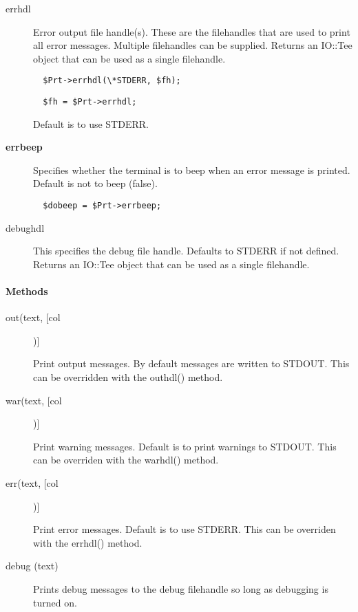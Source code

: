 \begin{description}
\item[errhdl] \mbox{}

Error output file handle(s). These are the filehandles that are used
to print all error messages. Multiple filehandles can be supplied.
Returns an IO::Tee object that can be used as a single filehandle.

\begin{verbatim}
  $Prt->errhdl(\*STDERR, $fh);
\end{verbatim}
\begin{verbatim}
  $fh = $Prt->errhdl;
\end{verbatim}


Default is to use STDERR.

\item[\textbf{errbeep}] \mbox{}

Specifies whether the terminal is to beep when an error
message is printed. Default is not to beep (false).

\begin{verbatim}
  $dobeep = $Prt->errbeep;
\end{verbatim}
\item[debughdl] \mbox{}

This specifies the debug file handle. Defaults to STDERR if not 
defined. Returns an IO::Tee object that can be used as a single
filehandle.

\end{description}
\paragraph*{Methods\label{ORAC::Print_Methods}}\begin{description}
\item[out(text, [col])] \mbox{}

Print output messages.
By default messages are written to STDOUT. This can be overridden with
the outhdl() method.

\item[war(text, [col])] \mbox{}

Print warning messages.
Default is to print warnings to STDOUT. This can be overriden with
the warhdl() method.

\item[err(text, [col])] \mbox{}

Print error messages.
Default is to use STDERR. This can be overriden with the errhdl()
method.

\item[debug (text)] \mbox{}

Prints debug messages to the debug filehandle so long as debugging
is turned on.

\end{description}
